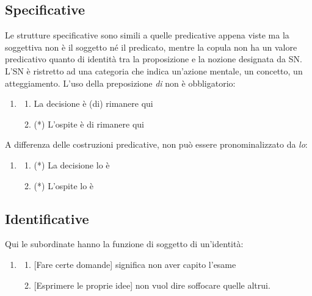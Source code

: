 \documentclass[
  a4paper,
  twoside,
  11pt,
  chapterprefix=false,
  bibliography=totocnumbered,
  listof=flat]{scrbook}
\providecommand{\tightlist}{%
  \setlength{\itemsep}{0pt}\setlength{\parskip}{0pt}}
\begin{document}
\hypertarget{specificative}{%
\subsection{Specificative}\label{specificative}}

Le strutture specificative sono simili a quelle predicative appena viste ma la soggettiva non è il soggetto né il predicato, mentre la copula non ha un valore predicativo quanto di identità tra la proposizione e la nozione designata da SN. L'SN è ristretto ad una categoria che indica un'azione mentale, un concetto, un atteggiamento. L'uso della preposizione \emph{di} non è obbligatorio:

\begin{enumerate}
\def\labelenumi{(\arabic{enumi})}
\setcounter{enumi}{36}
\item
  \begin{enumerate}
  \def\labelenumii{\alph{enumii}.}
  \tightlist
  \item
    La decisione è (di) rimanere qui
  \item
    (*) L'ospite è di rimanere qui
  \end{enumerate}
\end{enumerate}

A differenza delle costruzioni predicative, non può essere pronominalizzato da \emph{lo}:

\begin{enumerate}
\def\labelenumi{(\arabic{enumi})}
\setcounter{enumi}{37}
\item
  \begin{enumerate}
  \def\labelenumii{\alph{enumii}.}
  \tightlist
  \item
    (*) La decisione lo è
  \item
    (*) L'ospite lo è
  \end{enumerate}
\end{enumerate}

\hypertarget{identificative}{%
\subsection{Identificative}\label{identificative}}

Qui le subordinate hanno la funzione di soggetto di un'identità:

\begin{enumerate}
\def\labelenumi{(\arabic{enumi})}
\setcounter{enumi}{38}
\item
  \begin{enumerate}
  \def\labelenumii{\alph{enumii}.}
  \tightlist
  \item
    {[}Fare certe domande{]} significa non aver capito l'esame
  \item
    {[}Esprimere le proprie idee{]} non vuol dire soffocare quelle altrui.
  \end{enumerate}
\end{enumerate}
\end{document}
